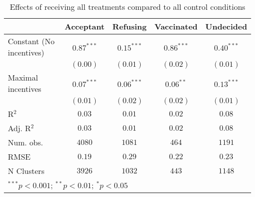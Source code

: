 
\begin{table}[h!]
\begin{center}
\begin{tabular}{l c c c c}
\hline
 & Acceptant & Refusing & Vaccinated & Undecided \\
\hline
Constant (No incentives) & $0.87^{***}$ & $0.15^{***}$ & $0.86^{***}$ & $0.40^{***}$ \\
                         & $(0.00)$     & $(0.01)$     & $(0.02)$     & $(0.01)$     \\
Maximal incentives       & $0.07^{***}$ & $0.06^{***}$ & $0.06^{**}$  & $0.13^{***}$ \\
                         & $(0.01)$     & $(0.02)$     & $(0.02)$     & $(0.01)$     \\
\hline
R$^2$                    & $0.03$       & $0.01$       & $0.02$       & $0.08$       \\
Adj. R$^2$               & $0.03$       & $0.01$       & $0.02$       & $0.08$       \\
Num. obs.                & $4080$       & $1081$       & $464$        & $1191$       \\
RMSE                     & $0.19$       & $0.29$       & $0.22$       & $0.23$       \\
N Clusters               & $3926$       & $1032$       & $443$        & $1148$       \\
\hline
\multicolumn{5}{l}{\scriptsize{$^{***}p<0.001$; $^{**}p<0.01$; $^{*}p<0.05$}}
\end{tabular}
\caption{\label{omnibus} Effects of receiving all treatments compared to all control conditions}
\label{table:coefficients}
\end{center}
\end{table}

